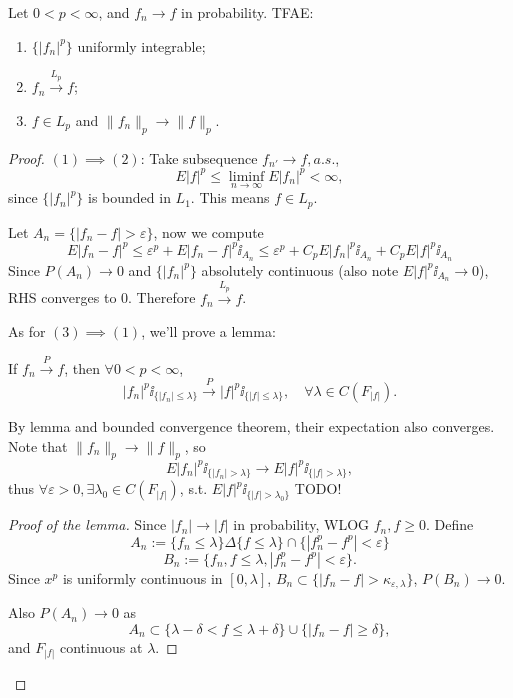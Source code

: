 \begin{theorem}
    Let $0<p<\infty$, and $f_n\to f$ in probability. TFAE:
	\begin{enumerate}[\indent (1)]
		\item $\{|f_n|^p\}$ uniformly integrable;
		\item $f_n \xrightarrow{L_p} f$;
		\item $f\in L_p$ and $ \lVert f_n \rVert _p \to \lVert f \rVert _p$.
	\end{enumerate}
\end{theorem}
\begin{proof}[Proof]
    $(1)\implies (2)$: Take subsequence $f_{n'} \to f, a.s.$,
	\[
	E|f|^p \le \liminf_{n\to \infty} E|f_n|^p < \infty,
	\]
	since $\{|f_n|^p\}$ is bounded in $L_1$. This means $f\in L_p$.

	Let $A_n = \{|f_n - f|> \varepsilon\}$, now we compute
	\[
	E|f_n - f|^p \le \varepsilon^p + E|f_n - f|^p \ii_{A_n}
	\le \varepsilon^p + C_p E|f_n|^p \ii_{A_n} + C_p E|f|^p\ii_{A_n}
	\]
	Since $P(A_n) \to 0$ and $\{|f_n|^p\}$ absolutely continuous
	(also note $E|f|^p \ii_{A_n} \to 0$), RHS converges to 0.
	Therefore $f_n \xrightarrow{L_p} f$.

	As for $(3)\implies (1)$, we'll prove a lemma:
	\begin{lemma}
		If $f_n \xrightarrow{P} f$, then $\forall 0<p<\infty$,
		\[
		|f_n|^p \ii_{\{|f_n|\le \lambda\}} \xrightarrow{P}
		|f|^p \ii_{\{|f|\le \lambda\}}, \quad \forall \lambda \in C(F_{|f|}).
		\]
	\end{lemma}

	By lemma and bounded convergence theorem, their expectation also converges.
	Note that $ \lVert f_n \rVert _p \to \lVert f \rVert _p$, so
	\[
	E|f_n|^p\ii_{\{|f_n|>\lambda\}} \to E|f|^p\ii_{\{|f|>\lambda\}},
	\]
	thus $\forall \varepsilon>0, \exists \lambda_0\in C(F_{|f|})$, s.t.
	$E|f|^p\ii_{\{|f|>\lambda_0\}}$ TODO!

	\begin{proof}[Proof of the lemma]
	    Since $|f_n| \to |f|$ in probability, WLOG $f_n ,f \ge 0$.
		Define
		\[
		A_n := \{f_n \le \lambda\}\Delta\{f\le \lambda\} \cap
		\{|f_n^p-f^p|<\varepsilon\}
		\]
		\[
		B_n := \{f_n, f\le \lambda, |f_n^p - f^p| < \varepsilon\}.
		\]
		Since $x^p$ is uniformly continuous in $[0, \lambda]$,
		$B_n \subset \{|f_n - f| > \kappa_{\varepsilon, \lambda}\}$,
		$P(B_n) \to 0$.

		Also $P(A_n) \to 0$ as
		\[
		A_n \subset \{\lambda-\delta<f\le \lambda+\delta\}
		\cup \{|f_n - f|\ge \delta\},
		\]
		and $F_{|f|}$ continuous at $\lambda$.
	\end{proof}
\end{proof}

